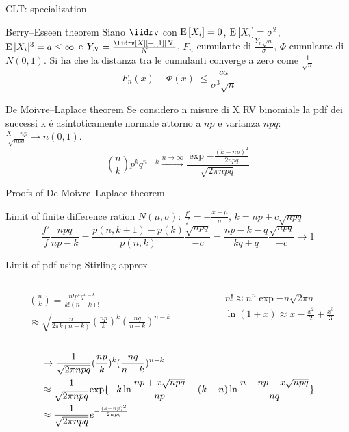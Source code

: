 \documentclass[asd-beamer.tex]{subfiles}
\begin{document}
\begin{frame}{CLT: specialization}
\begin{block}{Berry–Esseen theorem}
Siano $\iidrv$ con $\operatorname{E}{[X_i]}=0$, $\operatorname{E}{[X_i]}=\sigma^2$, $\operatorname{E}{|X_i|^3}=a\leq\infty$ e $Y_N=\frac{\iidrv[X][+][1][N]}{N}$, $F_n$ cumulante di $\frac{Y_n\sqrt{n}}{\sigma}$, $\Phi$ cumulante di $N(0,1)$. Si ha che la distanza tra le cumulanti converge a zero come $\frac{1}{\sqrt{n}}$
\[|F_n(x)-\Phi(x)|\leq\frac{ca}{\sigma^3\sqrt{n}}\]
\end{block}
\begin{block}{De Moivre–Laplace theorem}
Se considero n misure di X RV binomiale la pdf dei successi k \'e asintoticamente normale attorno a $np$ e varianza $npq$: $\frac{X-np}{\sqrt{npq}}\to n(0,1)$.
\[\binom{n}{k}p^kq^{n-k}\xrightarrow{n\to\infty}\frac{\exp{-\frac{(k-np)^2}{2npq}}}{\sqrt{2\pi npq}}\]
\end{block}
\end{frame}

\begin{frame}{Proofs of De Moivre–Laplace theorem}
\begin{block}{Limit of finite difference ration}
$N(\mu,\sigma)$: $\frac{f'}{f}=-\frac{x-\mu}{\sigma}$, $k=np+c\sqrt{npq}$
\[\frac{f'}{f}\frac{npq}{np-k}=\frac{p(n,k+1)-p(k)}{p(n,k)}\frac{\sqrt{npq}}{-c}=\frac{np-k-q}{kq+q}\frac{\sqrt{npq}}{-c}\to1\]
\end{block}
\begin{block}{Limit of pdf using Stirling approx}
\begin{columns}[T]
	\begin{column}{0.4\textwidth}
		\begin{align*}
		&\binom{n}{k}=\frac{n!p^kq^{n-k}}{k!(n-k)!}\\
		&\approx\sqrt{\frac{n}{2\pi k(n-k)}(\frac{np}{k})^k(\frac{nq}{n-k})^{n-k}}%
		\end{align*}
	\end{column}
	\begin{column}{0.6\textwidth}
\begin{align*}
&n!\approx n^n\exp{-n}\sqrt{2\pi n}\tag{Stirling approx}\\
&\ln{(1+x)}\approx x-\frac{x^2}{2}+\frac{x^3}{3}
\end{align*}
	\end{column}
\end{columns}
\begin{align*}
&\to\frac{1}{\sqrt{2\pi npq}}(\frac{np}{k})^k(\frac{nq}{n-k})^{n-k}\\
&\approx\frac{1}{\sqrt{2\pi npq}}\text{exp}\{-k\ln{\frac{np+x\sqrt{npq}}{np}}+(k-n)\ln{\frac{n-np-x\sqrt{npq}}{nq}}\}\\
&\approx\frac{1}{\sqrt{2\pi npq}}e^{-\frac{(k-np)^2}{2npq}}
\end{align*}
\end{block}
\end{frame}
\end{document}
